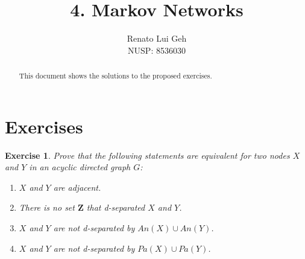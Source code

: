 \documentclass{amsart}
\title[]{4. Markov Networks}
\author[]{Renato Lui Geh\\NUSP\@: 8536030}
\theoremstyle{plain}
\newtheorem{exercise}{Exercise}
\begin{document}
\begin{abstract}
  This document shows the solutions to the proposed exercises.
  \vspace*{-2.5em}
\end{abstract}

\maketitle

\section{Exercises}

\begin{exercise}
  Prove that the following statements are equivalent for two nodes $X$ and $Y$ in an acyclic
  directed graph $G$:

  \begin{enumerate}[label=\roman*]
    \item $X$ and $Y$ are adjacent.
    \item There is no set $\mathbf{Z}$ that d-separated $X$ and $Y$.
    \item $X$ and $Y$ are not d-separated by $An(X)\cup An(Y)$.
    \item $X$ and $Y$ are not d-separated by $Pa(X)\cup Pa(Y)$.
  \end{enumerate}
\end{exercise}
\end{document}
